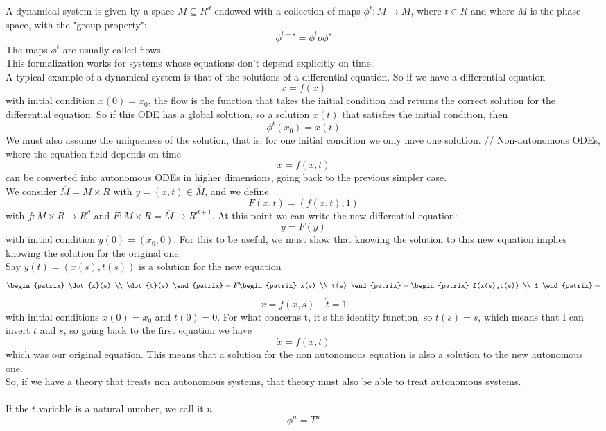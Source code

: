 A dynamical system is given by a space $M \subseteq R^d$ endowed with a collection of maps $\phi^t:M\rightarrow M$, where $t \in R$ and where $M$ is the phase space, with the "group property":
$$
	\phi^{t+s} = \phi^t o \phi^s
$$
The maps $\phi^t$ are usually called flows. \\ 
This formalization works for systems whose equations don't depend explicitly on time. \\
A typical example of a dynamical system is that of the solutions of a differential equation. So if we have a differential equation
$$
	\dot{x} = f(x)
$$
with initial condition $x(0) = x_0$, the flow is the function that takes the initial condition and returns the correct solution for the differential equation. So if this ODE has a global solution, so a solution $x(t)$ that satisfies the initial condition, then 
$$
	\phi^t(x_0) = x(t)
$$
We must also assume the uniqueness of the solution, that is, for one initial condition we only have one solution. //
Non-autonomous ODEs, where the equation field depends on time
$$
	\dot{x} = f(x,t)
$$
can be converted into autonomous ODEs in higher dimensions, going back to the previous simpler case. \\
We consider $\overline{M} = M \times R$ with $y = (x,t) \in \overline{M}$, and we define
$$
	F(x,t) = (f(x,t),1)
$$
with $f : M \times R \rightarrow R^d$ and $F : M \times R = \overline{M} \rightarrow R^{d+1}$. At this point we can write the new differential equation:
$$
	\dot{y} = F(y)
$$
with initial condition $y(0) = (x_0,0)$. For this to be useful, we must show that knowing the solution to this new equation implies knowing the solution for the original one. \\
Say $y(t) = (x(s),t(s))$ is a solution for the new equation
$$
	\begin{patrix}
		\dot{x}(s) \\ 
		\dot{t}(s)
	\end{patrix} = 
	F
	\begin{patrix}
		x(s) \\ 
		t(s)
	\end{patrix} =
	\begin{patrix}
		f(x(s),t(s)) \\ 
		1
	\end{patrix} = 
$$
$$
	\dot{x} = f(x,s) \ \ \ \ \ \dot{t} = 1
$$
with initial conditions $x(0) = x_0$ and $t(0) = 0$. For what concerns t, it's the identity function, so $t(s) = s$, which means that I can invert $t$ and $s$, so going back to the first equation we have
$$
	\dot{x} = f(x,t)
$$
which was our original equation. This means that a solution for the non autonomous equation is also a solution to the new autonomous one. \\
So, if we have a theory that treats non autonomous systems, that theory must also be able to treat autonomous systems. \\ \\
If the $t$ variable is a natural number, we call it $n$
$$
	\phi^n = T^n
$$

